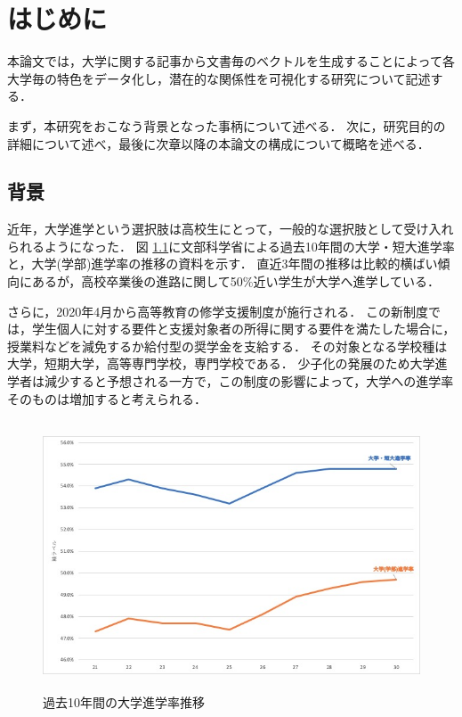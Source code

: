 \chapter{はじめに}
本論文では，大学に関する記事から文書毎のベクトルを生成することによって各大学毎の特色をデータ化し，潜在的な関係性を可視化する研究について記述する．

まず，本研究をおこなう背景となった事柄について述べる．
次に，研究目的の詳細について述べ，最後に次章以降の本論文の構成について概略を述べる．

\section{背景}
近年，大学進学という選択肢は高校生にとって，一般的な選択肢として受け入れられるようになった．
図 \ref{fig:univ_continuance_rate}に文部科学省による過去10年間の大学・短大進学率と，大学(学部)進学率の推移の資料\cite{univContinuanceRate}を示す．  
直近3年間の推移は比較的横ばい傾向にあるが，高校卒業後の進路に関して50\%近い学生が大学へ進学している．

さらに，2020年4月から高等教育の修学支援制度\cite{Shingakusyusienseido}が施行される．
この新制度では，学生個人に対する要件と支援対象者の所得に関する要件を満たした場合に，授業料などを減免するか給付型の奨学金を支給する．
その対象となる学校種は大学，短期大学，高等専門学校，専門学校である．
少子化の発展のため大学進学者は減少すると予想される一方で，この制度の影響によって，大学への進学率そのものは増加すると考えられる．
\begin{figure}[H]
\centering
\includegraphics[height=8cm]{images/univ_continuance_rate.jpg}
\caption{過去10年間の大学進学率推移}
\label{fig:univ_continuance_rate}
\end{figure}

